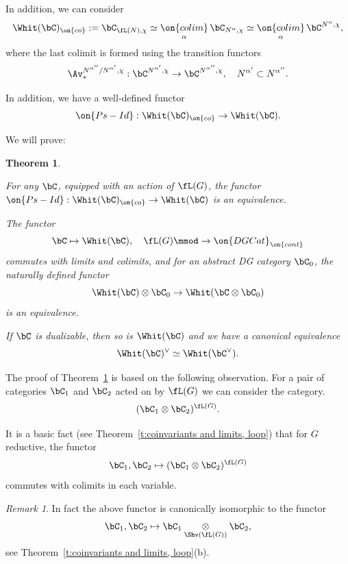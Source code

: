\documentclass[9pt]{amsart}
\newtheorem{thm}[subsubsection]{Theorem}
\theoremstyle{definition}
\theoremstyle{remark}
\newtheorem{rem}[subsubsection]{Remark}
\newcommand{\thmref}[1]{Theorem~\ref{#1}}
\numberwithin{equation}{section}
\begin{document}
\medskip

In addition, we can consider
$$\Whit(\bC)_{\on{co}}:=\bC_{\fL(N),\chi}\simeq \underset{\alpha}{\on{colim}}\, \bC_{N^\alpha,\chi}\simeq 
\underset{\alpha}{\on{colim}}\, \bC^{N^\alpha,\chi},$$
where the last colimit is formed using the transition functors
$$\Av^{N^{\alpha''}/N^{\alpha'},\chi}_*:\bC^{N^{\alpha'},\chi}\to \bC^{N^{\alpha''},\chi}, \quad N^{\alpha'}\subset N^{\alpha''}.$$

\medskip

In addition, we have a well-defined functor
$$\on{Ps-Id}:\Whit(\bC)_{\on{co}}\to \Whit(\bC).$$

\sssec{}



We will prove:

\begin{thm}   \label{t:abstract} \hfill

\smallskip

 For any $\bC$, equipped with an action of $\fL(G)$, 
 the functor $\on{Ps-Id}:\Whit(\bC)_{\on{co}}\to \Whit(\bC)$ is an equivalence. 

\smallskip

 The functor 
$$\bC\mapsto \Whit(\bC), \quad \fL(G)\mmod \to \on{DGCat}_{\on{cont}}$$
commutes with limits and colimits, and for an abstract DG category $\bC_0$, the naturally defined functor
$$\Whit(\bC)\otimes \bC_0\to \Whit(\bC\otimes \bC_0)$$
is an equivalence. 

\smallskip

 If $\bC$ is dualizable, then so is $\Whit(\bC)$ and we have a canonical equivalence 
$$\Whit(\bC)^\vee\simeq  \Whit(\bC^\vee).$$

\end{thm}

\sssec{}

The proof of \thmref{t:abstract} is based on the following observation. For a pair of categories $\bC_1$ and $\bC_2$ acted on by $\fL(G)$
we can consider the category. 
$$(\bC_1\otimes \bC_2)^{\fL(G)}.$$

It is a basic fact (see \thmref{t:coinvariants and limits, loop}) that for $G$ reductive, the functor
$$\bC_1,\bC_2\mapsto (\bC_1\otimes \bC_2)^{\fL(G)}$$
commutes with colimits in each variable.

\begin{rem}
In fact the above functor is canonically isomorphic to the functor 
$$\bC_1,\bC_2\mapsto  \bC_1\underset{\Shv(\fL(G))}\otimes \bC_2,$$
see \thmref{t:coinvariants and limits, loop}(b). 
\end{rem}
\end{document}
